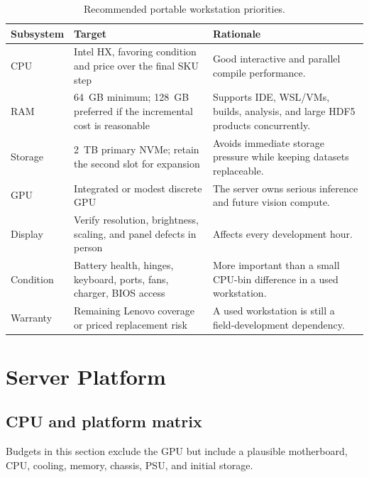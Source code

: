 \documentclass[11pt]{article}
\begin{document}
\begin{table}[htbp]
\centering
\small
\begin{tabularx}{\textwidth}{L{0.21\textwidth} L{0.27\textwidth} Y}
\toprule
Subsystem & Target & Rationale \\
\midrule
CPU & Intel HX, favoring condition and price over the final SKU step & Good interactive and parallel compile performance. \\
RAM & 64~GB minimum; 128~GB preferred if the incremental cost is reasonable & Supports IDE, WSL/VMs, builds, analysis, and large HDF5 products concurrently. \\
Storage & 2~TB primary NVMe; retain the second slot for expansion & Avoids immediate storage pressure while keeping datasets replaceable. \\
GPU & Integrated or modest discrete GPU & The server owns serious inference and future vision compute. \\
Display & Verify resolution, brightness, scaling, and panel defects in person & Affects every development hour. \\
Condition & Battery health, hinges, keyboard, ports, fans, charger, BIOS access & More important than a small CPU-bin difference in a used workstation. \\
Warranty & Remaining Lenovo coverage or priced replacement risk & A used workstation is still a field-development dependency. \\
\bottomrule
\end{tabularx}
\caption{Recommended portable workstation priorities.}
\end{table}

\section{Server Platform}

\subsection{CPU and platform matrix}

Budgets in this section exclude the GPU but include a plausible motherboard,
CPU, cooling, memory, chassis, PSU, and initial storage.
\end{document}
